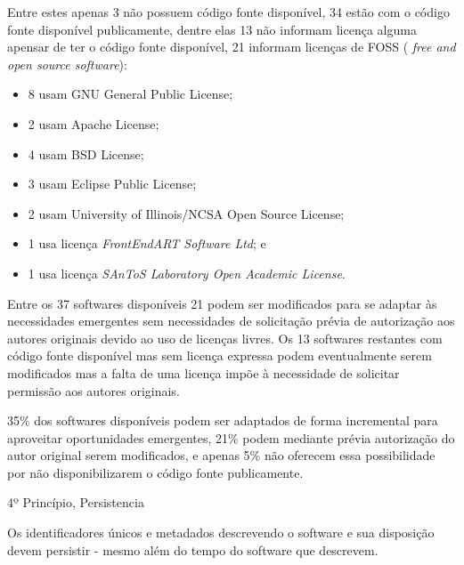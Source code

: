 Entre estes apenas 3 não possuem código fonte disponível, 34 estão com o código
fonte disponível publicamente, dentre elas 13 não informam licença alguma
apensar de ter o código fonte disponível, 21 informam licenças de FOSS ({\it
free and open source software}):

\begin{itemize}
  \item 8 usam GNU General Public License;
  \item 2 usam Apache License;
  \item 4 usam BSD License;
  \item 3 usam Eclipse Public License;
  \item 2 usam University of Illinois/NCSA Open Source License;
  \item 1 usa licença {\it FrontEndART Software Ltd}; e
  \item 1 usa licença {\it SAnToS Laboratory Open Academic License}.
\end{itemize}

Entre os 37 softwares disponíveis 21 podem ser modificados para se adaptar às
necessidades emergentes sem necessidades de solicitação prévia de autorização
aos autores originais devido ao uso de licenças livres. Os 13 softwares
restantes com código fonte disponível mas sem licença expressa podem
eventualmente serem modificados mas a falta de uma licença impõe à necessidade
de solicitar permissão aos autores originais.

35\% dos softwares disponíveis podem ser adaptados de forma incremental para
aproveitar oportunidades emergentes, 21\% podem mediante prévia autorização do
autor original serem modificados, e apenas 5\% não oferecem essa possibilidade
por não disponibilizarem o código fonte publicamente.

4º Princípio, Persistencia

Os identificadores únicos e metadados descrevendo o software e sua disposição
devem persistir - mesmo além do tempo do software que descrevem.



